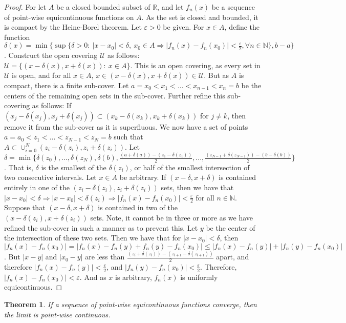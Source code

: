 \documentclass[crop=false,class=book]{standalone}
\theoremstyle{mystyle}
\newtheorem{theorem}{Theorem}[section]
\begin{document}
\begin{proof}
For let $A$ be a closed bounded subset of $\mathbb{R}$, and let $f_n(x)$ be a sequence of point-wise equicontinuous functions on $A$. As the set is closed and bounded, it is compact by the Heine-Borel theorem. Let $\varepsilon>0$ be given. For $x\in A$, define the function $\delta(x) = \min\{\sup\{\delta>0:\ |x-x_0|<\delta,\ x_0\in A \Rightarrow |f_n(x)-f_n(x_0)|<\frac{\varepsilon}{2}, \forall n\in\mathbb{N}\},b-a\}$. Construct the open covering $\mathcal{U}$ as follows: $\mathcal{U} = \{(x-\delta(x),x+\delta(x)):\ x\in A\}$. This is an open covering, as every set in $\mathcal{U}$ is open, and for all $x\in A$, $x\in(x-\delta(x),x+\delta(x))\in\mathcal{U}$. But as $A$ is compact, there is a finite sub-cover. Let $a=x_0<x_1<...<x_{n-1}<x_n=b$ be the centers of the remaining open sets in the sub-cover. Further refine this sub-covering as follows: If $(x_j-\delta(x_j),x_j+\delta(x_j))\subset (x_k-\delta(x_k),x_k+\delta(x_k))$ for $j\ne k$, then remove it from the sub-cover as it is superfluous. We now have a set of points $a=a_0<z_1<...<z_{N-1}<z_N=b$ such that $A \subset \cup_{i=0}^{N} (z_i-\delta(z_i),z_i+\delta(z_i))$. Let $\delta = \min\{\delta(z_0),...,\delta(z_N),\delta(b), \frac{(a+\delta(a)) - (z_1-\delta(z_1))}{2}, ..., \frac{(z_{N-1} + \delta(z_{N-1})) - (b-\delta(b))}{2}\}$. That is, $\delta$ is the smallest of the $\delta(z_i)$, or half of the smallest intersection of two consecutive intervals. Let $x\in A$ be arbitrary. If $(x-\delta,x+\delta)$ is contained entirely in one of the $(z_i-\delta(z_i),z_i+\delta(z_i))$ sets, then we have that $|x-x_0|<\delta \Rightarrow |x-x_0| <\delta(z_i) \Rightarrow |f_n(x)-f_n(x_0)|<\frac{\varepsilon}{2}$ for all $n\in\mathbb{N}$. Suppose that $(x-\delta,x+\delta)$ is contained in two of the $(x-\delta(z_i),x+\delta(z_i))$ sets. Note, it cannot be in three or more as we have refined the sub-cover in such a manner as to prevent this. Let $y$ be the center of the intersection of these two sets. Then we have that for $|x-x_0|<\delta$, then $|f_n(x)-f_n(x_0)| = |f_n(x) - f_n(y) + f_n(y) - f_n(x_0)| \leq |f_n(x) - f_n(y)| + |f_n(y) - f_n(x_0)|$. But $|x-y|$ and $|x_0-y|$ are less than $\frac{(z_i + \delta(z_i))-(z_{i+1}-\delta(z_{i+1}))}{2}$ apart, and therefore $|f_n(x) - f_n(y)|<\frac{\varepsilon}{2}$, and $|f_n(y) - f_n(x_0)| < \frac{\varepsilon}{2}$. Therefore, $|f_n(x) - f_n(x_0)|<\varepsilon$. And as $x$ is arbitrary, $f_n(x)$ is uniformly equicontinuous.
\end{proof}
\begin{theorem} If a sequence of point-wise equicontinuous functions converge, then the limit is point-wise continuous.
\end{theorem}
\end{document}
